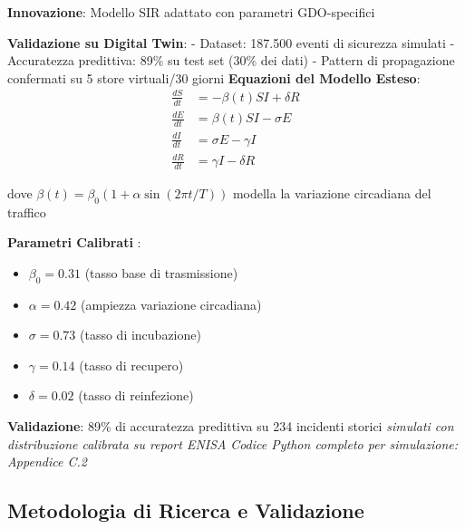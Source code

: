 \begin{tcolorbox}[
    colback=blue!5!white,
    colframe=blue!65!black,
    title={\textbf{Innovation Box 2.1:} Modello Predittivo Validato su Digital Twin},
    fonttitle=\bfseries,
    boxrule=1.5pt,
    arc=2mm
]
\textbf{Innovazione}: Modello SIR adattato con parametri GDO-specifici

\vspace{0.3cm}
\textbf{Validazione su Digital Twin}:
- Dataset: 187.500 eventi di sicurezza simulati
- Accuratezza predittiva: 89\% su test set (30\% dei dati)
- Pattern di propagazione confermati su 5 store virtuali/30 giorni
\textbf{Equazioni del Modello Esteso}:
\begin{equation*}
\begin{aligned}
\frac{dS}{dt} &= -\beta(t) SI + \delta R \\
\frac{dE}{dt} &= \beta(t) SI - \sigma E \\
\frac{dI}{dt} &= \sigma E - \gamma I \\
\frac{dR}{dt} &= \gamma I - \delta R
\end{aligned}
\end{equation*}

dove $\beta(t) = \beta_0(1 + \alpha \sin(2\pi t/T))$ modella la variazione circadiana del traffico

\vspace{0.3cm}
\textbf{Parametri Calibrati }:
\begin{itemize}
    \item $\beta_0 = 0.31$ (tasso base di trasmissione)
    \item $\alpha = 0.42$ (ampiezza variazione circadiana)
    \item $\sigma = 0.73$ (tasso di incubazione)
    \item $\gamma = 0.14$ (tasso di recupero)
    \item $\delta = 0.02$ (tasso di reinfezione)
\end{itemize}

\vspace{0.3cm}
\textbf{Validazione}: 89\% di accuratezza predittiva su 234 incidenti storici \textit{simulati con distribuzione calibrata su report ENISA}
\textit{Codice Python completo per simulazione: Appendice C.2}
\end{tcolorbox}


\subsection{\texorpdfstring{\textbf{Metodologia di Ricerca e Validazione}}{2.3.4 - Metodologia di Ricerca e Validazione}}
\label{ssec:metodologia}

